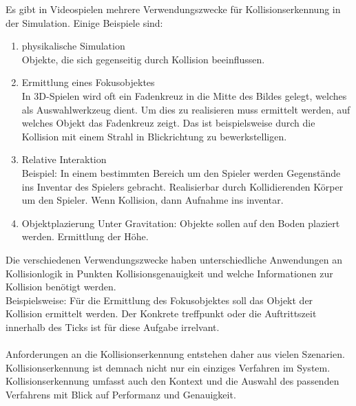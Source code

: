 
Es gibt in Videospielen mehrere Verwendungszwecke für Kollisionserkennung in der Simulation.
Einige Beispiele sind:
\begin{enumerate}
	\item physikalische Simulation\\
		Objekte, die sich gegenseitig durch Kollision beeinflussen.
	\item Ermittlung eines Fokusobjektes\\
		In 3D-Spielen wird oft ein Fadenkreuz in die Mitte des Bildes gelegt, welches als Auswahlwerkzeug dient. Um dies zu realisieren muss ermittelt werden, auf welches Objekt das Fadenkreuz zeigt. Das ist beispielsweise durch die Kollision mit einem Strahl in Blickrichtung zu bewerkstelligen.
	\item Relative Interaktion\\
		Beispiel: In einem bestimmten Bereich um den Spieler werden Gegenstände ins Inventar des Spielers gebracht. Realisierbar durch Kollidierenden Körper um den Spieler. Wenn Kollision, dann Aufnahme ins inventar.
	\item Objektplazierung
		Unter Gravitation: Objekte sollen auf den Boden plaziert werden. Ermittlung der Höhe.
\end{enumerate}

Die verschiedenen Verwendungszwecke haben unterschiedliche Anwendungen an Kollisionlogik in Punkten Kollisionsgenauigkeit und welche Informationen zur Kollision benötigt werden.\\
Beispielsweise: Für die Ermittlung des Fokusobjektes soll das Objekt der Kollision ermittelt werden. Der Konkrete treffpunkt oder die Auftrittszeit innerhalb des Ticks ist für diese Aufgabe irrelvant.\\
\\
Anforderungen an die Kollisionserkennung entstehen daher aus vielen Szenarien. Kollisionserkennung ist demnach nicht nur ein einziges Verfahren im System. Kollisionserkennung umfasst auch den Kontext und die Auswahl des passenden Verfahrens mit Blick auf Performanz und Genauigkeit.
